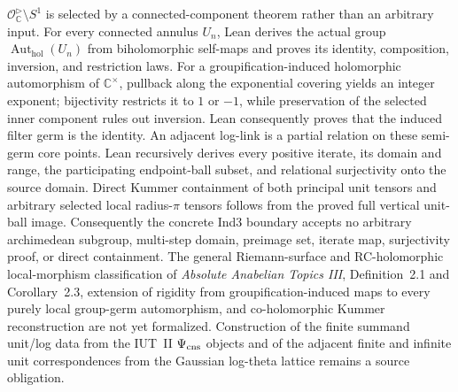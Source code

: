 \documentclass[11pt]{article}
\theoremstyle{plain}
\theoremstyle{definition}
\theoremstyle{remark}
\begin{document}
\(\mathcal O^{\triangleright}_{\mathbb C}\setminus S^1\) is selected by a
connected-component theorem rather than an arbitrary input.  For every
connected annulus \(U_n\), Lean derives the actual group
\(\operatorname{Aut}_{\mathrm{hol}}(U_n)\) from biholomorphic self-maps and
proves its identity, composition, inversion, and restriction laws.  For a
groupification-induced holomorphic automorphism of \(\mathbb C^\times\),
pullback along the exponential covering yields an integer exponent;
bijectivity restricts it to \(1\) or \(-1\), while preservation of the selected
inner component rules out inversion.  Lean consequently proves that the
induced filter germ is the identity.  An adjacent log-link is a partial
relation on these semi-germ core points.  Lean recursively
derives every positive iterate, its domain and range,
the participating endpoint-ball subset, and relational surjectivity onto the
source domain.  Direct Kummer containment of both principal unit tensors and
arbitrary selected local radius-\(\pi\) tensors follows from the proved full
vertical unit-ball image.  Consequently the concrete Ind3 boundary accepts no
arbitrary archimedean subgroup, multi-step domain, preimage set, iterate map,
surjectivity proof, or direct containment.  The general Riemann-surface and
RC-holomorphic local-morphism classification of
\emph{Absolute Anabelian Topics III}, Definition~2.1 and Corollary~2.3,
extension of rigidity from groupification-induced maps to every purely local
group-germ automorphism, and co-holomorphic Kummer reconstruction are not yet
formalized.  Construction of the
finite summand unit/log data from the IUT~II \(\Psi_{\rm cns}\) objects and of
the adjacent finite and infinite unit correspondences from the Gaussian
log-theta lattice remains a source obligation.
\end{document}
